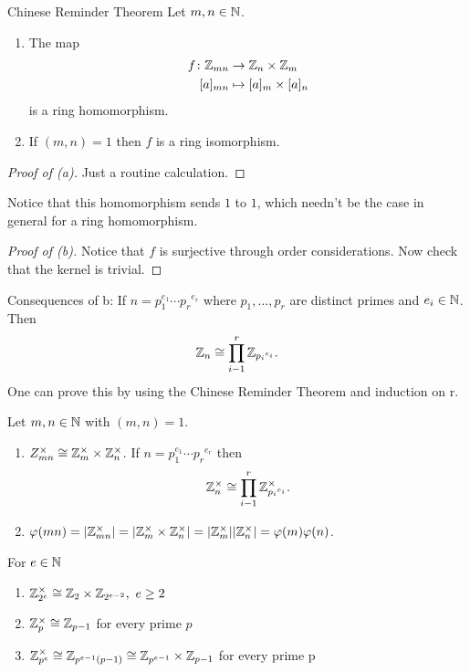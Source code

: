 \documentclass[11pt,leqno,oneside]{amsart}
\newcommand{\primedecomposition}[3]{#1_1^{#2_1} \cdots {#1_{#3}}^{#2_{#3}}}
\begin{document}
\begin{prop*}[1.2.3]{Chinese Reminder Theorem}
  Let \(m,n \in {\mathbb N}\).
  \begin{enumerate}
  \item[(a)] The map
    \begin{align*}
      f \colon {\mathbb Z}_{mn} &\to {\mathbb Z}_n \times {\mathbb Z}_m\\
      [a]_{mn}&\mapsto [a]_m \times [a]_n
    \end{align*}
    is a ring homomorphism.
  \item[(b)] If \((m,n)=1\) then \(f\) is a ring isomorphism.
  \end{enumerate}
\end{prop*}
\begin{proof}[Proof of (a)]
  Just a routine calculation.
\end{proof}
Notice that this homomorphism sends \(1\) to \(1\), which needn't be the case in
general for a ring homomorphism.
\begin{proof}[Proof of (b)]
  Notice that \(f\) is surjective through order considerations. Now check that
  the kernel is trivial.
\end{proof}
Consequences of b: If \(n=\primedecomposition{p}{e}{r}\) where
\(p_1,\ldots,p_r\) are distinct primes and \(e_i \in {\mathbb N}\). Then
\[{\mathbb Z}_n \mathrel{\cong} \prod_{i-1}^r {\mathbb Z}_{{p_i}^{e_i}}.\]
One can prove this by using the Chinese Reminder Theorem and induction on r.
\begin{cor*}[1.2.4]
  Let \(m,n \in {\mathbb N}\) with \((m,n)=1\).
  \begin{enumerate}
  \item[(a)] \(Z_{mn}^\times \mathrel{\cong} {\mathbb Z}_m^\times \times {\mathbb Z}_n^\times\). If
    \(n=\primedecomposition{p}{e}{r}\) then
    \[{\mathbb Z}_n^\times \mathrel{\cong} \prod_{i-1}^r {\mathbb Z}^\times_{{p_i}^{e_i}}.\]
  \item[(b)]
    \(\varphi(mn)=|{\mathbb Z}_{mn}^\times|=|{\mathbb Z}_{m}^\times\times
    {\mathbb Z}_{n}^\times|=|{\mathbb Z}_{m}^\times||{\mathbb Z}_{n}^\times|=\varphi(m)\varphi(n)\).
  \end{enumerate}
\end{cor*}
\begin{prop*}[1.2.5]
  For \(e \in {\mathbb N}\)
  \begin{enumerate}
    \item[(a)] \({\mathbb Z}_{2^e}^\times \mathrel{\cong} {\mathbb Z}_2 \times {\mathbb Z}_{2^{e-2}},\ e \ge 2\)
    \item[(b)] \({\mathbb Z}_p^\times \mathrel{\cong} {\mathbb Z}_{p-1}\) for every prime \(p\)
    \item[(c)] \({\mathbb Z}_{p^e}^\times \mathrel{\cong} {\mathbb Z}_{p^{e-1}(p-1)} \mathrel{\cong} {\mathbb Z}_{p^{e-1}} \times {\mathbb Z}_{p-1} \) for every prime p
  \end{enumerate}
\end{prop*}
\end{document}
